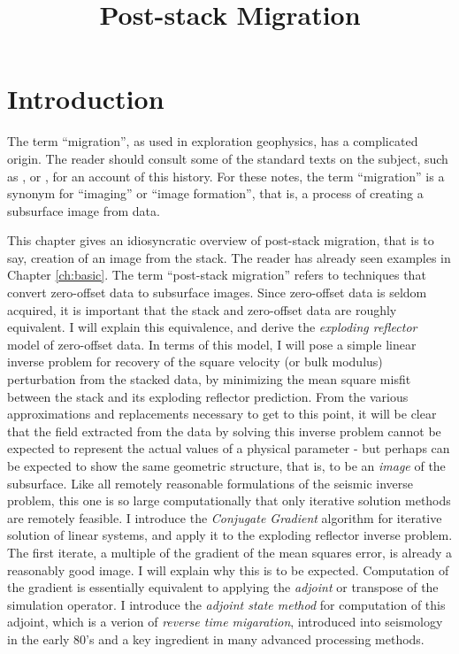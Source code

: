 \title{Post-stack Migration}
\maketitle
\label{ch:post}

\section{Introduction}
The term ``migration'', as used in exploration geophysics, has a complicated origin. The reader should consult some of the standard texts on the subject, such as \cite{Dob:88}, or \cite{SheriffGeldart:1995}, for an account of this history. For these notes, the term ``migration'' is a synonym for ``imaging'' or ``image formation'', that is, a process of creating a subsurface image from data. 

This chapter gives an idiosyncratic overview of post-stack migration, that is to say, creation of an image from the stack. The reader has already seen examples in Chapter \ref{ch:basic}. The term ``post-stack migration'' refers to techniques that convert zero-offset data to subsurface images. Since zero-offset data is seldom acquired, it is important that the stack and zero-offset data are roughly equivalent. I will explain this equivalence, and derive the {\em exploding reflector} model of zero-offset data. In terms of this model, I will pose a simple linear inverse problem for recovery of the square velocity (or bulk modulus) perturbation from the stacked data, by minimizing the mean square misfit between the stack and its exploding reflector prediction. From the various approximations and replacements necessary to get to this point, it will be clear that the field extracted from the data by solving this inverse problem cannot be expected to represent the actual values of a physical parameter - but perhaps can be expected to show the same geometric structure, that is, to be an {\em image} of the subsurface. Like all remotely reasonable formulations of the seismic inverse problem, this one is so large computationally that only iterative solution methods are remotely feasible. I introduce the {\em Conjugate Gradient} algorithm for iterative solution of linear systems, and apply it to the exploding reflector inverse problem. The first iterate, a multiple of the gradient of the mean squares error, is already a reasonably good image. I will explain why this is to be expected. Computation of the gradient is essentially equivalent to applying the {\em adjoint} or transpose of the simulation operator. I introduce the {\em adjoint state method} for computation of this adjoint, which is a verion of {\em reverse time migaration}, introduced into seismology in the early 80's and a key ingredient in many advanced processing methods.

